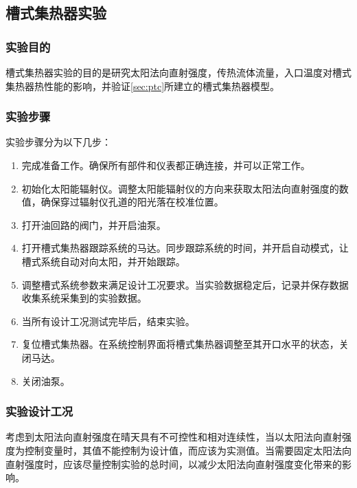 \subsection{槽式集热器实验}
\subsubsection{实验目的}
槽式集热器实验的目的是研究太阳法向直射强度，传热流体流量，入口温度对槽式集热器热性能的影响，并验证\autoref{sec:ptc}所建立的槽式集热器模型。

\subsubsection{实验步骤}
实验步骤分为以下几步：
\begin{enumerate}[label=(\arabic*)]
	\item 完成准备工作。确保所有部件和仪表都正确连接，并可以正常工作。
	\item 初始化太阳能辐射仪。调整太阳能辐射仪的方向来获取太阳法向直射强度的数值，确保穿过辐射仪孔道的阳光落在校准位置。
	\item 打开油回路的阀门，并开启油泵。
	\item 打开槽式集热器跟踪系统的马达。同步跟踪系统的时间，并开启自动模式，让槽式系统自动对向太阳，并开始跟踪。
	\item 调整槽式系统参数来满足设计工况要求。当实验数据稳定后，记录并保存数据收集系统采集到的实验数据。
	\item 当所有设计工况测试完毕后，结束实验。
	\item 复位槽式集热器。在系统控制界面将槽式集热器调整至其开口水平的状态，关闭马达。
	\item 关闭油泵。
\end{enumerate}

\subsubsection{实验设计工况}

考虑到太阳法向直射强度在晴天具有不可控性和相对连续性，当以太阳法向直射强度为控制变量时，其值不能控制为设计值，而应该为实测值。当需要固定太阳法向直射强度时，应该尽量控制实验的总时间，以减少太阳法向直射强度变化带来的影响。

